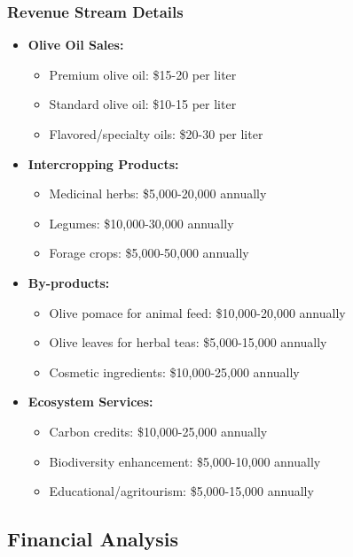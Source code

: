 \subsubsection{Revenue Stream Details}
\begin{itemize}
    \item \textbf{Olive Oil Sales:}
    \begin{itemize}
        \item Premium olive oil: \$15-20 per liter
        \item Standard olive oil: \$10-15 per liter
        \item Flavored/specialty oils: \$20-30 per liter
    \end{itemize}
    
    \item \textbf{Intercropping Products:}
    \begin{itemize}
        \item Medicinal herbs: \$5,000-20,000 annually
        \item Legumes: \$10,000-30,000 annually
        \item Forage crops: \$5,000-50,000 annually
    \end{itemize}
    
    \item \textbf{By-products:}
    \begin{itemize}
        \item Olive pomace for animal feed: \$10,000-20,000 annually
        \item Olive leaves for herbal teas: \$5,000-15,000 annually
        \item Cosmetic ingredients: \$10,000-25,000 annually
    \end{itemize}
    
    \item \textbf{Ecosystem Services:}
    \begin{itemize}
        \item Carbon credits: \$10,000-25,000 annually
        \item Biodiversity enhancement: \$5,000-10,000 annually
        \item Educational/agritourism: \$5,000-15,000 annually
    \end{itemize}
\end{itemize}

\subsection{Financial Analysis}

